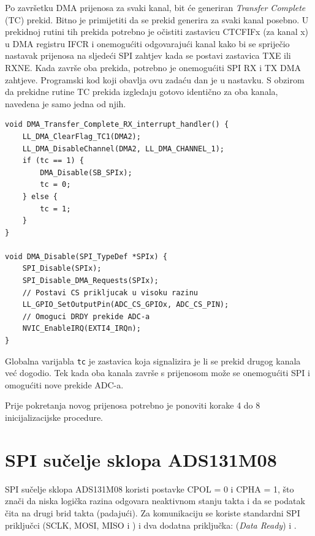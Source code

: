 Po završetku DMA prijenosa za svaki kanal, bit će generiran \textit{Transfer Complete} (TC) prekid. Bitno je primijetiti da se prekid generira za svaki kanal posebno. U prekidnoj rutini tih prekida potrebno je očistiti zastavicu CTCFIFx (za kanal x) u DMA registru IFCR i onemogućiti odgovarajući kanal kako bi se spriječio nastavak prijenosa na sljedeći SPI zahtjev kada se postavi zastavica TXE ili RXNE. Kada završe oba prekida, potrebno je onemogućiti SPI RX i TX DMA zahtjeve. Programski kod koji obavlja ovu zadaću dan je u nastavku. S obzirom da prekidne rutine TC prekida izgledaju gotovo identično za oba kanala, navedena je samo jedna od njih.

\begin{lstlisting}[caption={Prekidna rutina prekida \textit{DMA Transfer Complete}}]
void DMA_Transfer_Complete_RX_interrupt_handler() {
	LL_DMA_ClearFlag_TC1(DMA2);
	LL_DMA_DisableChannel(DMA2, LL_DMA_CHANNEL_1);
	if (tc == 1) {
		DMA_Disable(SB_SPIx);
		tc = 0;
	} else {
		tc = 1;
	}
}

void DMA_Disable(SPI_TypeDef *SPIx) {
	SPI_Disable(SPIx);
	SPI_Disable_DMA_Requests(SPIx);
	// Postavi CS prikljucak u visoku razinu
	LL_GPIO_SetOutputPin(ADC_CS_GPIOx, ADC_CS_PIN);
	// Omoguci DRDY prekide ADC-a
	NVIC_EnableIRQ(EXTI4_IRQn);
}
\end{lstlisting}

Globalna varijabla \texttt{tc} je zastavica koja signalizira je li se prekid drugog kanala već dogodio. Tek kada oba kanala završe s prijenosom može se onemogućiti SPI i omogućiti nove prekide ADC-a.

Prije pokretanja novog prijenosa potrebno je ponoviti korake 4 do 8 inicijalizacijske procedure.

\section{SPI sučelje sklopa ADS131M08}
SPI sučelje sklopa ADS131M08 koristi postavke CPOL = 0 i CPHA = 1, što znači da niska logička razina odgovara neaktivnom stanju takta i da se podatak čita na drugi brid takta (padajući). Za komunikaciju se koriste standardni SPI priključci (SCLK, MOSI, MISO i ) i dva dodatna priključka:  (\textit{Data Ready}) i .


